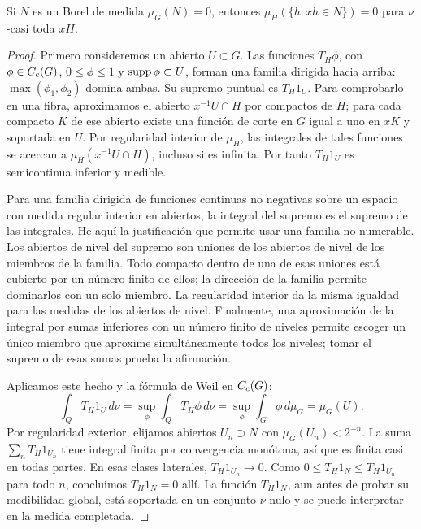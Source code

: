 \begin{lema}\label{v4:mod-nulos}
Si $N$ es un Borel de medida $\mu_G(N)=0$, entonces
$\mu_H(\{h:xh\in N\})=0$ para $\nu$-casi toda $xH$.
\end{lema}
\begin{proof}
Primero consideremos un abierto $U\subset G$. Las funciones
$T_H\phi$, con $\phi\in C_c(G)$, $0\leq\phi\leq1$ y $\operatorname{supp}\phi\subset U$, forman una familia dirigida hacia arriba: $\max(\phi_1,\phi_2)$ domina ambas. Su supremo puntual es $T_H1_U$. Para comprobarlo en una fibra, aproximamos el abierto $x^{-1}U\cap H$ por compactos de $H$; para cada compacto $K$ de ese abierto existe una función de corte en $G$ igual a uno en $xK$ y soportada en $U$. Por regularidad interior de $\mu_H$, las integrales de tales funciones se acercan a $\mu_H(x^{-1}U\cap H)$, incluso si es infinita. Por tanto $T_H1_U$ es semicontinua inferior y medible.

Para una familia dirigida de funciones continuas no negativas sobre un espacio con medida regular interior en abiertos, la integral del supremo es el supremo de las integrales. He aquí la justificación que permite usar una familia no numerable. Los abiertos de nivel del supremo son uniones de los abiertos de nivel de los miembros de la familia. Todo compacto dentro de una de esas uniones está cubierto por un número finito de ellos; la dirección de la familia permite dominarlos con un solo miembro. La regularidad interior da la misma igualdad para las medidas de los abiertos de nivel. Finalmente, una aproximación de la integral por sumas inferiores con un número finito de niveles permite escoger un único miembro que aproxime simultáneamente todos los niveles; tomar el supremo de esas sumas prueba la afirmación.

Aplicamos este hecho y la fórmula de Weil en $C_c(G)$:
\[
 \int_Q T_H1_U\,d\nu
 =\sup_\phi\int_Q T_H\phi\,d\nu
 =\sup_\phi\int_G\phi\,d\mu_G=\mu_G(U).
\]
Por regularidad exterior, elijamos abiertos $U_n\supset N$ con $\mu_G(U_n)<2^{-n}$. La suma $\sum_nT_H1_{U_n}$ tiene integral finita por convergencia monótona, así que es finita casi en todas partes. En esas clases laterales, $T_H1_{U_n}\to0$. Como $0\leq T_H1_N\leq T_H1_{U_n}$ para todo $n$, concluimos $T_H1_N=0$ allí. La función $T_H1_N$, aun antes de probar su medibilidad global, está soportada en un conjunto $\nu$-nulo y se puede interpretar en la medida completada.
\end{proof}

